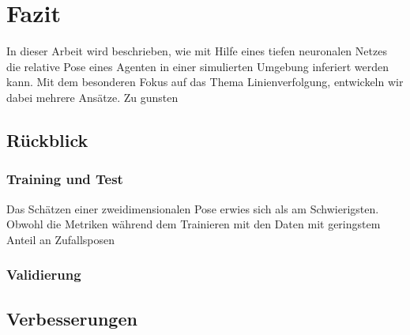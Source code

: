 \chapter{Fazit}

In dieser Arbeit wird beschrieben, wie mit Hilfe eines tiefen neuronalen Netzes die relative Pose eines Agenten in einer simulierten Umgebung inferiert werden kann. Mit dem besonderen Fokus auf das Thema Linienverfolgung, entwickeln wir dabei mehrere Ansätze. Zu gunsten 

\section{Rückblick}



\subsection{Training und Test}

Das Schätzen einer zweidimensionalen Pose erwies sich als am Schwierigsten. Obwohl die Metriken während dem Trainieren mit den Daten mit geringstem Anteil an Zufallsposen 

\subsection{Validierung}

\section{Verbesserungen}
